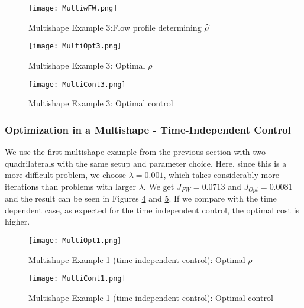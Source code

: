 \begin{figure}[h]
	\centering
	\texttt{[image: MultiwFW.png]}
	\caption{Multishape Example 3:Flow profile determining $\widehat \rho$} 
	\label{FM3}
\end{figure}
\begin{figure}[h]
	\centering
	\texttt{[image: MultiOpt3.png]}
	\caption{Multishape Example 3: Optimal $\rho$} 
	\label{FM3a}
\end{figure}
\begin{figure}[h]
	\centering
	\texttt{[image: MultiCont3.png]}
	\caption{Multishape Example 3: Optimal control} 
	\label{FM3b}
\end{figure}
\subsubsection{Optimization in a Multishape - Time-Independent Control}
We use the first multishape example from the previous section with two quadrilaterals with the same setup and parameter choice. Here, since this is a more difficult problem, we choose $\lambda = 0.001$, which takes considerably more iterations than problems with larger $\lambda$.
We get $J_{FW} = 0.0713$ and $J_{Opt} = 0.0081$ and the result can be seen in Figures \ref{FM1} and \ref{FM2}. If we compare with the time dependent case, as expected for the time independent control, the optimal cost is higher.



\begin{figure}[h]
	\centering
	\texttt{[image: MultiOpt1.png]}
	\caption{Multishape Example 1 (time independent control): Optimal $\rho$} 
	\label{FM1}
\end{figure}
\begin{figure}[h]
	\centering
	\texttt{[image: MultiCont1.png]}
	\caption{Multishape Example 1 (time independent control): Optimal control} 
	\label{FM2}
\end{figure}

